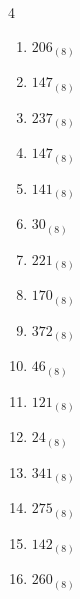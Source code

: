\begin{multicols}{4}
\begin{enumerate}
  \item $206_{(8)}$

        \phantom{$=134$}

  \item $147_{(8)}$

        \phantom{$=103$}

  \item $237_{(8)}$

        \phantom{$=159$}

  \item $147_{(8)}$

        \phantom{$=103$}

  \item $141_{(8)}$

        \phantom{$=97$}

  \item $30_{(8)}$

        \phantom{$=24$}

  \item $221_{(8)}$

        \phantom{$=145$}

  \item $170_{(8)}$

        \phantom{$=120$}

  \item $372_{(8)}$

        \phantom{$=250$}

  \item $46_{(8)}$

        \phantom{$=38$}

  \item $121_{(8)}$

        \phantom{$=81$}

  \item $24_{(8)}$

        \phantom{$=20$}

  \item $341_{(8)}$

        \phantom{$=225$}

  \item $275_{(8)}$

        \phantom{$=189$}

\columnbreak %

  \item $142_{(8)}$

        \phantom{$=98$}

  \item $260_{(8)}$


\end{enumerate}
\end{multicols}
